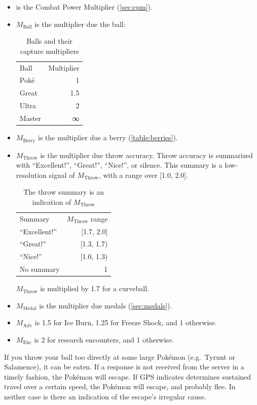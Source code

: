 \begin{itemize}
  \item \CPM{} is the Combat Power Multiplier (\autoref{sec:cpm}).
  \item $M_\mathrm{Ball}$ is the multiplier due the ball:
\begin{table}[h!]
\centering
\begin{tabular}{lr}
Ball & Multiplier\\
\Midrule
Poké & 1\\
Great & 1.5\\
Ultra & 2\\
Master & ∞\\
\end{tabular}
  \caption{Balls and their capture multipliers\label{table:balls}}
\end{table}
\item $M_\mathrm{Berry}$ is the multiplier due a berry (\autoref{table:berries}).
\item $M_\mathrm{Throw}$ is the multiplier due throw accuracy. Throw accuracy is summarized
   with ``Excellent!'', ``Great!'', ``Nice!'', or silence.
    This summary is a low-resolution signal of $M_\mathrm{Throw}$, with a range over [1.0, 2.0].
\begin{table}[h!]
\centering
\begin{tabular}{lr}
Summary & $M_\mathrm{Throw}$ range\\
\Midrule
``Excellent!'' & [1.7, 2.0]\\
``Great!'' & [1.3, 1.7)\\
``Nice!'' & [1.0, 1.3)\\
No summary & 1\\
\end{tabular}
  \caption{The throw summary is an indication of $M_\mathrm{Throw}$\label{table:throw}}
\end{table}
$M_\mathrm{Throw}$ is multiplied by 1.7 for a curveball.
\item $M_\mathrm{Medal}$ is the multiplier due medals (\autoref{sec:medals}).
\item $M_\mathrm{Adv}$ is 1.5 for Ice Burn, 1.25 for Freeze Shock, and 1 otherwise.
\item $M_\mathrm{Enc}$ is 2 for research encounters, and 1 otherwise.
\end{itemize}
If you throw your ball too directly at some large Pokémon (e.g.\ Tyrunt or Salamence), it can be eaten.
If a response is not received from the server in a timely fashion, the Pokémon will escape.
If GPS indicates determines sustained travel over a certain speed, the Pokémon will escape, and probably flee.
In neither case is there an indication of the escape's irregular cause.

